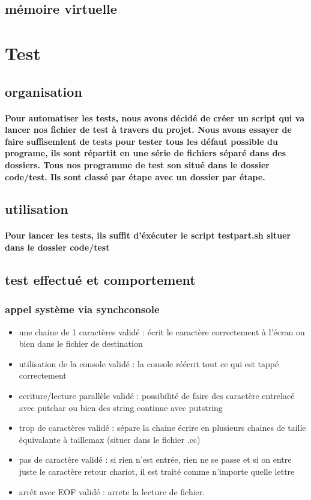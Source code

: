 \documentclass{report}
\begin{document}
	\subsection{mémoire virtuelle}

\section{Test}
	\subsection{organisation}
		\paragraph{Pour automatiser les tests, nous avons décidé de créer un script qui va lancer nos fichier de test à travers du projet.
		Nous avons essayer de faire suffisemlent de tests pour tester tous les défaut possible du programe, ils sont répartit en une série de fichiers séparé dans des dossiers.
		Tous nos programme de test son situé dans le dossier code/test. Ils sont classé par étape avec un dossier par étape.}

	\subsection{utilisation}
		\paragraph{Pour lancer les tests, ils suffit d'éxécuter le script testpart.sh situer dans le dossier code/test}

	\subsection{test effectué et comportement}
		\subsubsection{appel système via synchconsole}
			\begin{itemize}
				\item une chaine de 1 caractères 			validé : écrit le caractère	correctement à l'écran ou bien dans le fichier de destination
				\item utilisation de la console				validé : la console réécrit tout ce qui est tappé correctement
				\item ecriture/lecture parallèle			validé : possibilité de faire des caractère entrelacé avec putchar ou bien des string continue avec putstring
				\item trop de caractères					validé : sépare la chaine écrire en plusieurs chaines de taille équivalante à taillemax (situer dans le fichier .cc)
				\item pas de caractère 						validé : si rien n'est entrée, rien ne se passe et si on entre juste le caractère retour chariot, il est traité comme n'importe quelle lettre
				\item arrêt avec EOF 						validé : arrete la lecture de fichier.
			\end{itemize}
\end{document}
